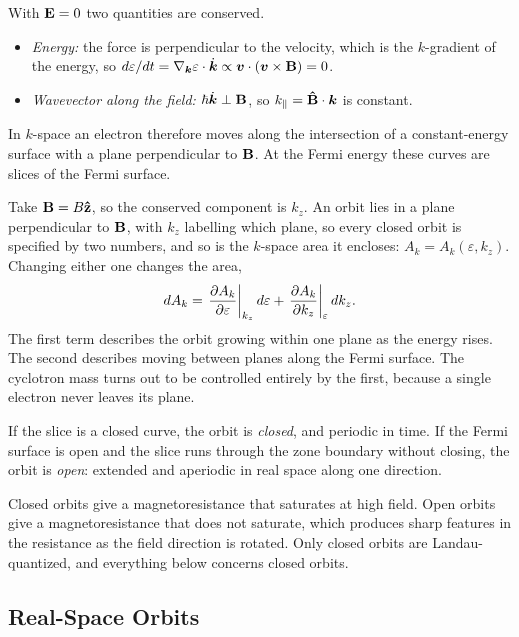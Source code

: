 With $\cvect{E} = 0$ two quantities are conserved.
\begin{itemize}
    \item \emph{Energy:} the force is perpendicular to the velocity, which is the $k$-gradient of the energy, so $d\varepsilon/dt = \nabla_{\lvect{k}}\varepsilon\cdot\dot{\lvect{k}} \propto \lvect{v}\cdot(\lvect{v}\times\cvect{B}) = 0$.
    \item \emph{Wavevector along the field:} $\hbar\dot{\lvect{k}}\perp\cvect{B}$, so $k_\parallel = \boldsymbol{\hat{\textbf{B}}}\cdot\bm{k}$ is constant.
\end{itemize}
In $k$-space an electron therefore moves along the intersection of a constant-energy surface with a plane perpendicular to $\cvect{B}$. At the Fermi energy these curves are slices of the Fermi surface.

Take $\cvect{B} = B\uvect{z}$, so the conserved component is $k_z$. An orbit lies in a plane perpendicular to $\cvect{B}$, with $k_z$ labelling which plane, so every closed orbit is specified by two numbers, and so is the $k$-space area it encloses: $A_k = A_k(\varepsilon, k_z)$. Changing either one changes the area,
\begin{equation}
    dA_k = \left.\pdv{A_k}{\varepsilon}\right|_{k_z}d\varepsilon + \left.\pdv{A_k}{k_z}\right|_{\varepsilon}dk_z.
    \label{eq:semi-dA}
\end{equation}
The first term describes the orbit growing within one plane as the energy rises. The second describes moving between planes along the Fermi surface. The cyclotron mass turns out to be controlled entirely by the first, because a single electron never leaves its plane.

\begin{definition}
If the slice is a closed curve, the orbit is \emph{closed}, and periodic in time. If the Fermi surface is open and the slice runs through the zone boundary without closing, the orbit is \emph{open}: extended and aperiodic in real space along one direction.
\end{definition}

Closed orbits give a magnetoresistance that saturates at high field. Open orbits give a magnetoresistance that does not saturate, which produces sharp features in the resistance as the field direction is rotated. Only closed orbits are Landau-quantized, and everything below concerns closed orbits.

\subsection{Real-Space Orbits}

